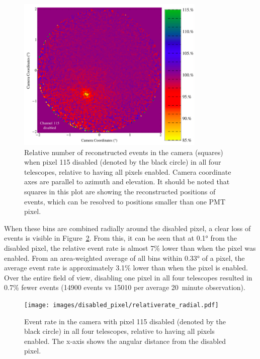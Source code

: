 \begin{figure}[!ht]
  \centering
  \includegraphics[width=0.8\textwidth]{images/disabled_pixel/relativerate_camera}
  \caption[Relative Event Rate After Disabling Camera Pixels]{
    Relative number of reconstructed events in the camera (squares) when pixel 115 disabled (denoted by the black circle) in all four telescopes, relative to having all pixels enabled.
    Camera coordinate axes are parallel to azimuth and elevation.
    It should be noted that squares in this plot are showing the reconstructed positions of events, which can be resolved to positions smaller than one PMT pixel.
  }
  \label{fig:dpix_rel_camera}
\end{figure}

When these bins are combined radially around the disabled pixel, a clear loss of events is visible in Figure~\ref{fig:dpix_rel_radial}.
From this, it can be seen that at \ang{0.1} from the disabled pixel, the relative event rate is almost 7\% lower than when the pixel was enabled.
From an area-weighted average of all bins within \ang{0.33} of a pixel, the average event rate is approximately 3.1\% lower than when the pixel is enabled.
Over the entire field of view, disabling one pixel in all four telescopes resulted in 0.7\% fewer events (14900 events vs 15010 per average \SI{20}{minute} observation).

\begin{figure}[!ht]
  \centering
  \texttt{[image: images/disabled\_pixel/relativerate\_radial.pdf]}
  \caption[Relative Event Rate in Radial Bins]{
    Event rate in the camera with pixel 115 disabled (denoted by the black circle) in all four telescopes, relative to having all pixels enabled.
    The x-axis shows the angular distance from the disabled pixel.
  }
  \label{fig:dpix_rel_radial}
\end{figure}


